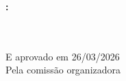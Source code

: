 \begin{folhadeaprovacao}

    \begin{center}
      {\ABNTEXchapterfont\large\MakeUppercase{\imprimirautor}}

      \vspace*{\fill}\vspace*{\fill}
      \begin{center}
        \ABNTEXchapterfont\bfseries\large\MakeUppercase{\imprimirtitulo}\normalfont\MakeUppercase{:
        \imprimirsubtitulo}
      \end{center}
      \vspace*{\fill}

      \hfill
      \begin{minipage}{.7\textwidth}
          \imprimirpreambulo \\ \\
          E aprovado em 26/03/2026 \\
          Pela comissão organizadora
      \end{minipage}%
      \vspace*{\fill}
     \end{center}

\end{folhadeaprovacao}

% 
